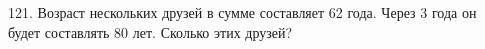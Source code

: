 121. Возраст нескольких друзей в сумме составляет 62 года. Через 3 года он будет составлять 80 лет. Сколько этих друзей?\\
